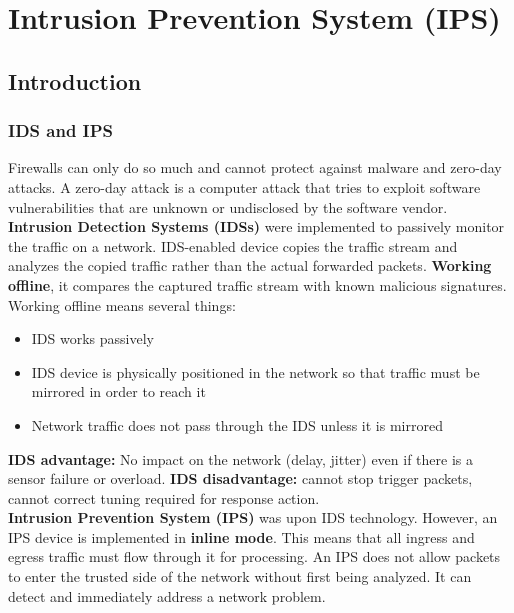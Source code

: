 \chapter{Intrusion Prevention System (IPS)}

\section{Introduction}

\subsection{IDS and IPS}

Firewalls can only do so much and cannot protect against malware and zero-day attacks. A zero-day attack is a computer attack that tries to exploit software vulnerabilities that are unknown or undisclosed by the software vendor. \\

\textbf{Intrusion Detection Systems (IDSs)} were implemented to passively monitor the traffic on a network. IDS-enabled device copies the traffic stream and analyzes the copied traffic rather than the actual forwarded packets. \textbf{Working offline}, it compares the captured traffic stream with known malicious signatures. Working offline means several things:

\begin{itemize}
\item IDS works passively
\item IDS device is physically positioned in the network so that traffic must be mirrored in order to reach it
\item Network traffic does not pass through the IDS unless it is mirrored
\end{itemize}

\textbf{IDS advantage:} No impact on the network (delay, jitter) even if there is a sensor failure or overload. \textbf{IDS disadvantage:} cannot stop trigger packets, cannot correct tuning required for response action.\\

\textbf{Intrusion Prevention System (IPS)} was upon IDS technology. However, an IPS device is implemented in \textbf{inline mode}. This means that all ingress and egress traffic must flow through it for processing. An IPS does not allow packets to enter the trusted side of the network without first being analyzed. It can detect and immediately address a network problem. \\

